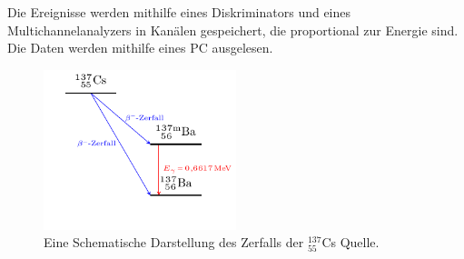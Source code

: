 Die Ereignisse werden mithilfe eines Diskriminators und eines Multichannelanalyzers in Kanälen gespeichert, die proportional zur Energie sind.
Die Daten werden mithilfe eines PC ausgelesen.
\begin{figure}[h!]
	\centering
	\includegraphics[width = 0.5\textwidth]{../Grafiken/Tikz/tikz-Energieschema.pdf}
	\caption{Eine Schematische Darstellung des Zerfalls der ${}^{137}_{55}$Cs Quelle.}\label{fig:Energieschema}
\end{figure}